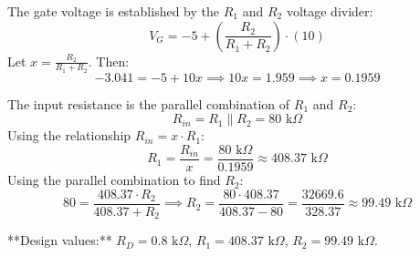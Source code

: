 \documentclass{article}
\begin{document}
The gate voltage is established by the $R_1$ and $R_2$ voltage divider:
$$ V_G = -5 + \left(\frac{R_2}{R_1 + R_2}\right) \cdot (10) $$
Let $x = \frac{R_2}{R_1 + R_2}$. Then:
$$ -3.041 = -5 + 10x \implies 10x = 1.959 \implies x = 0.1959 $$

The input resistance is the parallel combination of $R_1$ and $R_2$:
$$ R_{in} = R_1 \parallel R_2 = 80\text{ k}\Omega $$
Using the relationship $R_{in} = x \cdot R_1$:
$$ R_1 = \frac{R_{in}}{x} = \frac{80\text{ k}\Omega}{0.1959} \approx 408.37\text{ k}\Omega $$
Using the parallel combination to find $R_2$:
$$ 80 = \frac{408.37 \cdot R_2}{408.37 + R_2} \implies R_2 = \frac{80 \cdot 408.37}{408.37 - 80} = \frac{32669.6}{328.37} \approx 99.49\text{ k}\Omega $$

**Design values:** $R_D = 0.8\text{ k}\Omega$, $R_1 = 408.37\text{ k}\Omega$, $R_2 = 99.49\text{ k}\Omega$.
\end{document}
